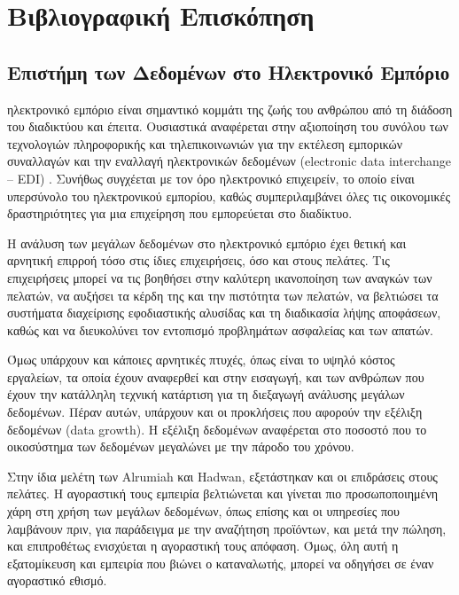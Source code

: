 \documentclass[greek, 12pt]{article}
\begin{document}
\newpage


\section{Βιβλιογραφική Επισκόπηση}


\subsection{Επιστήμη των Δεδομένων στο Ηλεκτρονικό Εμπόριο}

 ηλεκτρονικό εμπόριο είναι σημαντικό κομμάτι της ζωής του ανθρώπου από τη διάδοση του διαδικτύου και έπειτα. Ουσιαστικά αναφέρεται στην αξιοποίηση του συνόλου των τεχνολογιών πληροφορικής και τηλεπικοινωνιών για την εκτέλεση εμπορικών συναλλαγών και την εναλλαγή ηλεκτρονικών δεδομένων (electronic data interchange – EDI) \cite{jain2021overview}. Συνήθως συγχέεται με τον όρο ηλεκτρονικό επιχειρείν, το οποίο είναι υπερσύνολο του ηλεκτρονικού εμπορίου, καθώς συμπεριλαμβάνει όλες τις οικονομικές δραστηριότητες για μια επιχείρηση που εμπορεύεται στο διαδίκτυο. \cite{turban2017introduction}

Η ανάλυση των μεγάλων δεδομένων στο ηλεκτρονικό εμπόριο έχει θετική και αρνητική επιρροή τόσο στις ίδιες επιχειρήσεις, όσο και στους πελάτες. \cite{alrumiah2021implementing} Τις επιχειρήσεις μπορεί να τις βοηθήσει στην καλύτερη ικανοποίηση των αναγκών των πελατών, να αυξήσει τα κέρδη της και την πιστότητα των πελατών, να βελτιώσει τα συστήματα διαχείρισης εφοδιαστικής αλυσίδας και τη διαδικασία λήψης αποφάσεων, καθώς και να διευκολύνει τον εντοπισμό προβλημάτων ασφαλείας και των απατών. 

Όμως υπάρχουν και κάποιες αρνητικές πτυχές, όπως είναι το υψηλό κόστος εργαλείων, τα οποία έχουν αναφερθεί και στην εισαγωγή, και των ανθρώπων που έχουν την κατάλληλη τεχνική κατάρτιση για τη διεξαγωγή ανάλυσης μεγάλων δεδομένων. Πέραν αυτών, υπάρχουν και οι προκλήσεις που αφορούν την εξέλιξη δεδομένων (data growth). Η εξέλιξη δεδομένων αναφέρεται στο ποσοστό που το οικοσύστημα των δεδομένων μεγαλώνει με την πάροδο του χρόνου. \cite{Seagate.com} 

Στην ίδια μελέτη των Alrumiah και Hadwan\cite{alrumiah2021implementing}, εξετάστηκαν και οι επιδράσεις στους πελάτες. Η αγοραστική τους εμπειρία βελτιώνεται και γίνεται πιο προσωποποιημένη χάρη στη χρήση των μεγάλων δεδομένων, όπως επίσης και οι υπηρεσίες που λαμβάνουν πριν, για παράδειγμα με την αναζήτηση προϊόντων, και μετά την πώληση, και επιπροθέτως ενισχύεται η αγοραστική τους απόφαση. Όμως, όλη αυτή η εξατομίκευση και εμπειρία που βιώνει ο καταναλωτής, μπορεί να οδηγήσει σε έναν αγοραστικό εθισμό.
\end{document}
